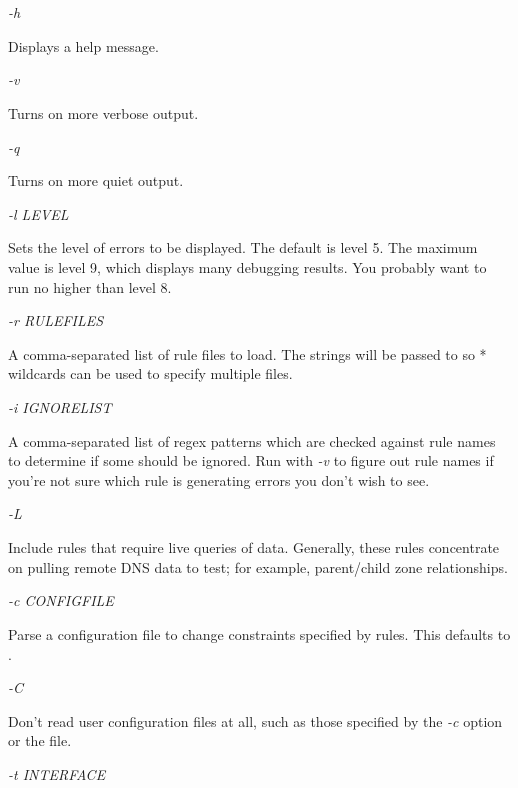 \begin{description}

\item {\it -h}\verb" "

Displays a help message.

\item {\it -v}\verb" "

Turns on more verbose output.

\item {\it -q}\verb" "

Turns on more quiet output.

\item {\it -l LEVEL}\verb" "

Sets the level of errors to be displayed.  The default is level 5.
The maximum value is level 9, which displays many debugging results.
You probably want to run no higher than level 8.

\item {\it -r RULEFILES}\verb" "

A comma-separated list of rule files to load.  The strings will be
passed to  so * wildcards can be used to specify multiple files.

\item {\it -i IGNORELIST}\verb" "

A comma-separated list of regex patterns which are checked against
rule names to determine if some should be ignored.  Run with {\it -v}
to figure out rule names if you're not sure which rule is generating
errors you don't wish to see.

\item {\it -L}\verb" "

Include rules that require live queries of data.  Generally, these
rules concentrate on pulling remote DNS data to test;
for example, parent/child zone relationships.

\item {\it -c CONFIGFILE}\verb" "

Parse a configuration file to change constraints specified by rules.
This defaults to .

\item {\it -C}\verb" "

Don't read user configuration files at all, such as those specified by
the {\it -c} option or the  file.

\item {\it -t INTERFACE}\verb" "


\end{description}
